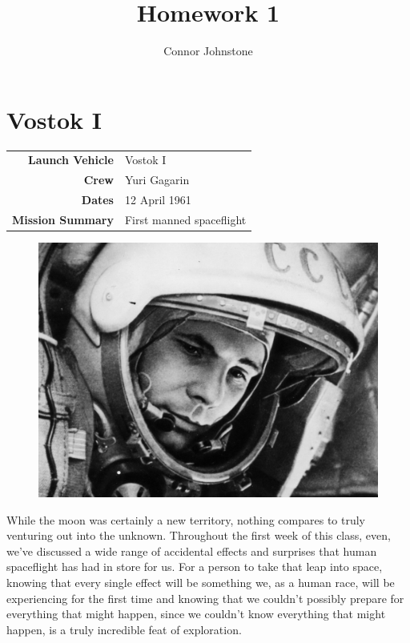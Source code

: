 \documentclass{article}
\begin{document}
  \title{Homework 1}
  \author{Connor Johnstone}

  \maketitle

  \section{Vostok I}

  \begin{center}
    \begin{tabular}{ >{\bfseries}r | p{3.5in} }
      \hline
      Launch Vehicle & Vostok I \\
      Crew & Yuri Gagarin \\
      Dates & 12 April 1961 \\
      Mission Summary & First manned spaceflight \\
      \hline
    \end{tabular}
  \end{center}

  \begin{figure}
    \includegraphics[width=0.9\linewidth]{yuri.jpg}
  \end{figure}

  While the moon was certainly a new territory, nothing compares to truly
  venturing out into the unknown. Throughout the first week of this class, even,
  we've discussed a wide range of accidental effects and surprises that human
  spaceflight has had in store for us. For a person to take that leap into space,
  knowing that every single effect will be something we, as a human race, will be
  experiencing for the first time and knowing that we couldn't possibly prepare
  for everything that might happen, since we couldn't know everything that might
  happen, is a truly incredible feat of exploration. 
  
\end{document}
